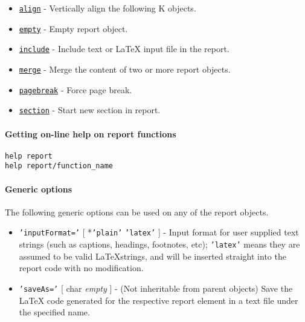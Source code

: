 \begin{itemize}
\itemsep1pt\parskip0pt
\item
  \href{report/align}{\texttt{align}} - Vertically align the following K
  objects.
\item
  \href{report/empty}{\texttt{empty}} - Empty report object.
\item
  \href{report/include}{\texttt{include}} - Include text or LaTeX input
  file in the report.
\item
  \href{report/merge}{\texttt{merge}} - Merge the content of two or more
  report objects.
\item
  \href{report/pagebreak}{\texttt{pagebreak}} - Force page break.
\item
  \href{report/section}{\texttt{section}} - Start new section in report.
\end{itemize}

\paragraph{Getting on-line help on report
functions}

\begin{verbatim}
help report
help report/function_name
\end{verbatim}

\paragraph{Generic options}

The following generic options can be used on any of the report objects.

\begin{itemize}
\item
  \texttt{'inputFormat='} {[} *\texttt{'plain'} \textbar{}
  \texttt{'latex'} {]} - Input format for user supplied text strings
  (such as captions, headings, footnotes, etc); \texttt{'latex'} means
  they are assumed to be valid \LaTeX strings, and will be inserted
  straight into the report code with no modification.
\item
  \texttt{'saveAs='} {[} char \textbar{} \emph{empty} {]} - (Not
  inheritable from parent objects) Save the LaTeX code generated for the
  respective report element in a text file under the specified name.
\end{itemize}



